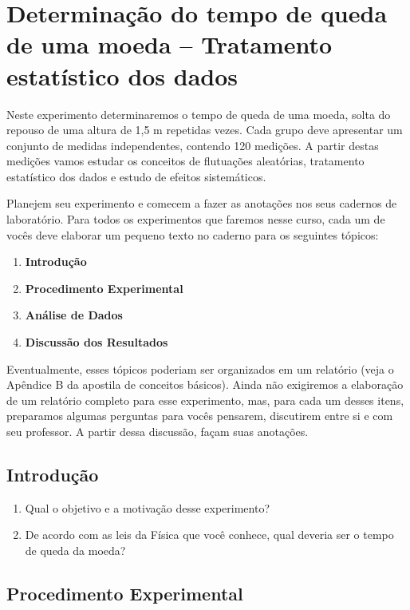 
\chapter{Determinação do tempo de queda de uma moeda  -- Tratamento estatístico dos dados}


\vspace{-0.7cm}
Neste experimento determinaremos o tempo de queda de uma moeda, solta do repouso de uma altura de 1,5 m repetidas vezes. Cada grupo deve apresentar um conjunto de medidas independentes, contendo 120 medições. A partir destas medições vamos estudar os conceitos de flutuações aleatórias, tratamento estatístico dos dados e estudo de efeitos sistemáticos. 

Planejem seu experimento e comecem a fazer as anotações nos seus cadernos de laboratório. Para todos os experimentos que faremos nesse curso, cada um de vocês deve elaborar um pequeno texto no caderno para os seguintes tópicos: 

\begin{enumerate}
\item {\bf Introdução }
\item {\bf Procedimento Experimental}
\item {\bf Análise de Dados}
\item {\bf Discussão dos Resultados}
\end{enumerate}

Eventualmente, esses tópicos poderiam ser organizados em um relatório (veja o Apêndice B da apostila de conceitos básicos). Ainda não exigiremos a elaboração de um relatório completo para esse experimento, mas, 
para cada um desses itens, preparamos algumas perguntas para vocês pensarem,  discutirem entre si e com seu professor. A partir dessa discussão, façam suas anotações. 

\section{Introdução}

\begin{enumerate}
\item Qual o objetivo e a motivação desse experimento?
\item De acordo com as leis da Física que você conhece, qual deveria ser o tempo de queda da moeda? 
\end{enumerate}

\vspace{-0.6cm}
\section{Procedimento Experimental}

